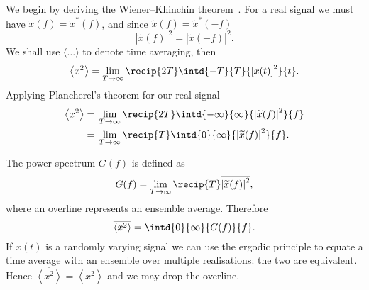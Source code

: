 We begin by deriving the Wiener–Khinchin theorem~\citep[chapter 28]{Kittel1958}. For a real signal we must have $\widetilde{x}(f) = \widetilde{x}^\ast(f)$, and since $\widetilde{x}(f) = \widetilde{x}^\ast(-f)$
\begin{equation}
\left|\widetilde{x}(f)\right|^2 = \left|\widetilde{x}(-f)\right|^2.
\end{equation}
We shall use $\langle\ldots\rangle$ to denote time averaging, then
\begin{equation}
\left\langle x^2\right\rangle = \lim_{T \rightarrow \infty} \recip{2T} \intd{-T}{T}{\left[x(t)\right]^2}{t}.
\end{equation}
Applying Plancherel's theorem for our real signal
\begin{align}
\left\langle x^2\right\rangle = {} & \lim_{T \rightarrow \infty} \recip{2T} \intd{-\infty}{\infty}{\left|\widetilde{x}(f)\right|^2}{f} \nonumber \\
 = {} & \lim_{T \rightarrow \infty} \recip{T} \intd{0}{\infty}{\left|\widetilde{x}(f)\right|^2}{f}.
\end{align}

The power spectrum $G(f)$ is defined as
\begin{equation}
G(f) = \lim_{T \rightarrow \infty} \recip{T} \overline{\left|\widetilde{x}(f)\right|^2},
\end{equation}
where an overline represents an ensemble average. Therefore
\begin{equation}
\overline{\left\langle x^2\right\rangle} = \intd{0}{\infty}{G(f)}{f}.
\end{equation}
If $x(t)$ is a randomly varying signal we can use the ergodic principle to equate a time average with an ensemble over multiple realisations: the two are equivalent. Hence $\overline{\left\langle x^2\right\rangle} = \left\langle x^2\right\rangle$ and we may drop the overline.

